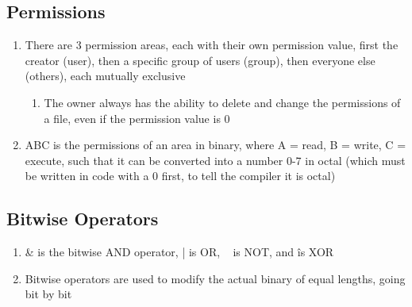 \documentclass[11 pt, twoside]{article}
\begin{document}
\subsection{Permissions}
\begin{enumerate}
\item There are 3 permission areas, each with their own permission value, first the creator (user), then a specific group of users (group), then everyone else (others), each mutually exclusive
\begin{enumerate}
\item The owner always has the ability to delete and change the permissions of a file, even if the permission value is 0
\end{enumerate}
\item ABC is the permissions of an area in binary, where A = read, B = write, C = execute, such that it can be converted into a number 0-7 in octal (which must be written in code with a 0 first, to tell the compiler it is octal)
\end{enumerate}

\subsection{Bitwise Operators}
\begin{enumerate}
\item \& is the bitwise AND operator, | is OR, ~ is NOT, and \^ is XOR
\item Bitwise operators are used to modify the actual binary of equal lengths, going bit by bit
\end{enumerate}
\end{document}
